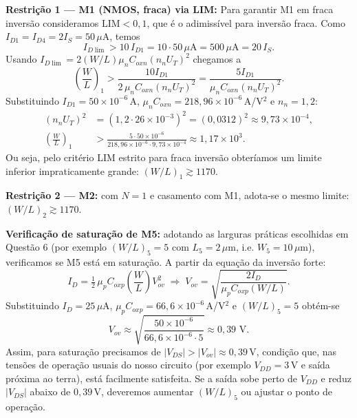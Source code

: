 \documentclass[12pt,a4paper]{article}
\begin{document}
    	\textbf{Restrição 1 — M1 (NMOS, fraca) via LIM:}
Para garantir M1 em fraca inversão consideramos $\mathrm{LIM}<0{,}1$, que é o adimissível para inversão fraca. Como $I_{D1}=I_{D4}=2I_S=50\,\mu$A, temos
\begin{equation*}
I_{D\lim} > 10\,I_{D1} = 10\cdot 50\,\mu\text{A} = 500\,\mu\text{A} = 20\,I_S.
\end{equation*}
Usando $I_{D\lim}=2(W/L)\mu_n C_{ox n}(n_n U_T)^2$ chegamos a
\begin{equation*}
\left(\frac{W}{L}\right)_1 > \frac{10 I_{D1}}{2\,\mu_n C_{ox n}(n_n U_T)^2} = \frac{5 I_{D1}}{\mu_n C_{ox n}(n_n U_T)^2}.
\end{equation*}
Substituindo $I_{D1}=50\times10^{-6}\,$A, $\mu_n C_{ox n}=218{,}96\times10^{-6}\,$A/V$^2$ e $n_n=1{,}2$:
\begin{align*}
(n_n U_T)^2 &= (1{,}2\cdot26\times10^{-3})^2=(0{,}0312)^2\approx 9{,}73\times10^{-4},\\
\left(\frac{W}{L}\right)_1 &> \frac{5\cdot 50\times10^{-6}}{218{,}96\times10^{-6}\cdot 9{,}73\times10^{-4}} \approx \boxed{1{,}17\times10^{3}}.
\end{align*}
Ou seja, pelo critério LIM estrito para fraca inversão obteríamos um limite inferior impraticamente grande: $(W/L)_1\gtrsim 1170$.

    	\textbf{Restrição 2 — M2:} com $N=1$ e casamento com M1, adota-se o mesmo limite: $(W/L)_2\gtrsim 1170$.

    	\textbf{Verificação de saturação de M5:} adotando as larguras práticas escolhidas em Questão 6 (por exemplo $(W/L)_5=5$ com $L_5=2\,\mu$m, i.e. $W_5=10\,\mu$m), verificamos se M5 está em saturação. A partir da equação da inversão forte:
\begin{equation}
I_D = \tfrac{1}{2}\,\mu_p C_{ox p}\left(\frac{W}{L}\right)V_{ov}^2 \;\Longrightarrow\; V_{ov} = \sqrt{\frac{2I_D}{\mu_p C_{ox p}(W/L)}}.
\end{equation}
Substituindo $I_D=25\,\mu$A, $\mu_p C_{ox p}=66{,}6\times10^{-6}\,$A/V$^2$ e $(W/L)_5=5$ obtém-se
\begin{equation}
V_{ov}\approx\sqrt{\frac{50\times10^{-6}}{66{,}6\times10^{-6}\cdot 5}}\approx 0{,}39\text{ V}.
\end{equation}
Assim, para saturação precisamos de $|V_{DS}|>|V_{ov}|\approx 0{,}39\,$V, condição que, nas tensões de operação usuais do nosso circuito (por exemplo $V_{DD}=3\,$V e saída próxima ao terra), está facilmente satisfeita. Se a saída sobe perto de $V_{DD}$ e reduz $|V_{DS}|$ abaixo de $0{,}39\,$V, deveremos aumentar $(W/L)_5$ ou ajustar o ponto de operação.
\end{document}
